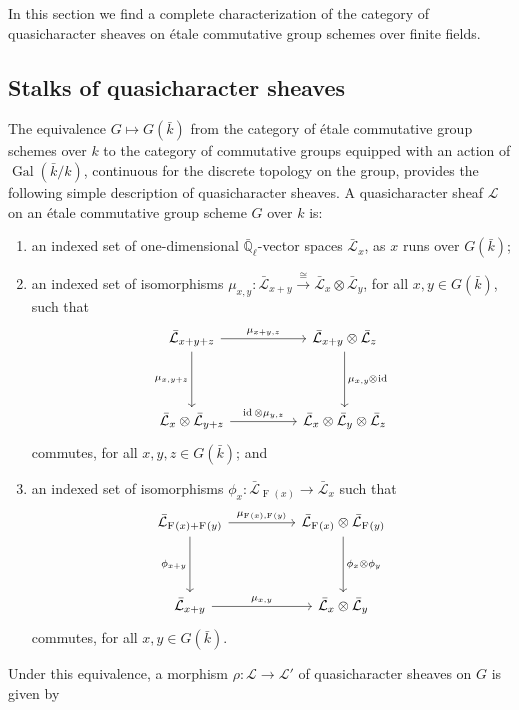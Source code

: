 \documentclass{amsart}
\makeatletter
\theoremstyle{plain}
\theoremstyle{definition}
\theoremstyle{remark}
\newcommand{\EE}{\mathbb{\bar Q}_\ell}
\newcommand{\bFq}{\bar{k}}
\newcommand{\Fq}{k}
\DeclareMathOperator{\Gal}{Gal}
\newcommand{\Frob}[1]{\operatorname{F}_{#1}}
\DeclareMathOperator{\id}{id}
\newcommand{\iso}{{\ \cong\ }}
\newcommand{\qcs}[1]{{\mathcal{#1}}}
\newcommand{\gqcs}[1]{{\mathcal{\bar #1}}}
\newcommand{\labitem}[2]{
\def\@itemlabel{\textbf{#1}}
\item
\def\@currentlabel{#1}\label{#2}}
\newcommand{\tight}[3]{\hspace{-#1pt}{#2}\hspace{-#3pt}}
\makeatother
\begin{document}
In this section we find a complete characterization of the category of quasicharacter sheaves on étale commutative group schemes over finite fields.

\subsection{Stalks of quasicharacter sheaves}

The equivalence $G \mapsto G(\bFq)$
from the category of \'etale commutative group schemes over $\Fq$ to the category of commutative groups equipped
with an action of $\Gal(\bFq/\Fq)$, continuous for the discrete topology on the group,
provides the following simple description of quasicharacter sheaves.
%
A quasicharacter sheaf $\qcs{L}$ on an étale commutative group scheme $G$ over $\Fq$ is:
\begin{enumerate}
 \labitem{(qc.1)}{qc.1} an indexed set of one-dimensional
  $\EE$-vector spaces $\gqcs{L}_x$, as $x$ runs over
  $G(\bFq)$;

 \labitem{(qc.2)}{qc.2} an indexed set of isomorphisms
  $\mu_{x,y} : \gqcs{L}_{x+y} \xrightarrow{\iso} \gqcs{L}_{x} \otimes\gqcs{L}_{y}$,
  for all $x,y \in G(\bFq)$, such that
  \[
   \begin{tikzcd}[row sep=40]
    \gqcs{L}_{x+y+z} \arrow{rr}{\mu_{x+y,z}} \arrow[swap]{d}{\mu_{x,y+z}}
    && \gqcs{L}_{x+y}\otimes\gqcs{L}_{z} \dar{\mu_{x,y} \tight{0.5}{\otimes}{1} \id} \\
    \gqcs{L}_{x} \otimes\gqcs{L}_{y+z} \arrow{rr}{\id \otimes\mu_{y,z}}
    && \gqcs{L}_{x} \otimes\gqcs{L}_{y} \otimes\gqcs{L}_{z}
   \end{tikzcd}
  \]
  commutes, for all $x,y,z\in G(\bFq)$; and
 \labitem{(qc.3)}{qc.3} an indexed set of isomorphisms $\phi_{x} : \gqcs{L}_{\Frob{}(x)} \to \gqcs{L}_x$
  such that
  \[
   \begin{tikzcd}[row sep=40]
    \gqcs{L}_{\Frob{}(x)+\Frob{}(y)} \arrow[swap]{d}{\phi_{x+y}} \arrow{rr}{\mu_{\Frob{}(x),\Frob{}(y)}}
    && \gqcs{L}_{\Frob{}(x)}\otimes\gqcs{L}_{\Frob{}(y)} \dar{\phi_x \tight{0}{\otimes}{0} \phi_y} \\
    \gqcs{L}_{x+y} \arrow{rr}{\mu_{x,y}}
    && \gqcs{L}_x \otimes\gqcs{L}_y
   \end{tikzcd}
  \]
  commutes, for all $x,y\in G(\bFq)$.
\end{enumerate}
Under this equivalence, a morphism $\rho : \qcs{L} \to \qcs{L'}$ of quasicharacter sheaves on $G$ is given by
\end{document}
